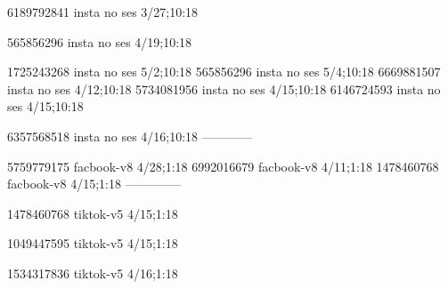 
6189792841 insta no ses
3/27;10:18

565856296 insta no ses
4/19;10:18

1725243268 insta no ses
5/2;10:18
565856296 insta no ses
5/4;10:18
6669881507 insta no ses
4/12;10:18
5734081956 insta no ses
4/15;10:18
6146724593 insta no ses
4/15;10:18

6357568518 insta no ses
4/16;10:18
------------


5759779175 facbook-v8
4/28;1:18
6992016679 facbook-v8
4/11;1:18
1478460768 facbook-v8
4/15;1:18
--------------

1478460768 tiktok-v5
4/15;1:18

1049447595 tiktok-v5
4/15;1:18

1534317836 tiktok-v5
4/16;1:18
